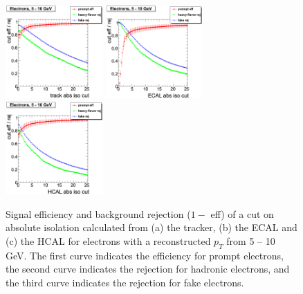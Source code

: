  \begin{figure}[htbp]
    \includegraphics[width = 0.33\textwidth]{pictures/absIsoCut_absIsoCutEff/absIsoCut_trackIso_cutEff_elec_ptCut0_ptCut1.png}
    \includegraphics[width = 0.33\textwidth]{pictures/absIsoCut_absIsoCutEff/absIsoCut_ecalIso_cutEff_elec_ptCut0_ptCut1.png}
    \includegraphics[width = 0.33\textwidth]{pictures/absIsoCut_absIsoCutEff/absIsoCut_hcalIso_cutEff_elec_ptCut0_ptCut1.png}
    \caption{Signal efficiency and background rejection ($1 -$ eff) of a cut on absolute isolation
       calculated from (a) the tracker, (b) the ECAL and (c) the HCAL for electrons with a
       reconstructed $p_{T}$ from 5 -- 10 GeV. The first curve indicates the efficiency for prompt
       electrons, the second curve indicates the rejection for hadronic electrons, and the third
       curve indicates the rejection for fake electrons.}
    \label{fig:AbsIsoCut_CutEffRej_Elec_PtCut0_PtCut1}
 \end{figure}

